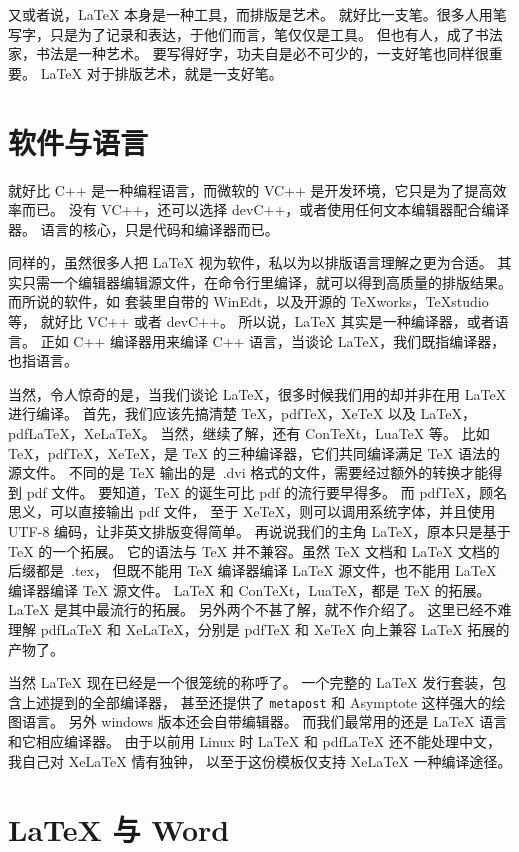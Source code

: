 又或者说，\LaTeX{} 本身是一种工具，而排版是艺术。
就好比一支笔。很多人用笔写字，只是为了记录和表达，于他们而言，笔仅仅是工具。
但也有人，成了书法家，书法是一种艺术。
要写得好字，功夫自是必不可少的，一支好笔也同样很重要。
\LaTeX{} 对于排版艺术，就是一支好笔。


\section{软件与语言}

就好比 C++ 是一种编程语言，而微软的 VC++ 是开发环境，它只是为了提高效率而已。
没有 VC++，还可以选择 devC++，或者使用任何文本编辑器配合编译器。
语言的核心，只是代码和编译器而已。

同样的，虽然很多人把 \LaTeX{} 视为软件，私以为以排版语言理解之更为合适。
其实只需一个编辑器编辑源文件，在命令行里编译，就可以得到高质量的排版结果。
而所说的软件，如 \CTeX 套装里自带的 WinEdt，以及开源的 TeXworks，TeXstudio 等，
就好比 VC++ 或者 devC++。
所以说，\LaTeX{} 其实是一种编译器，或者语言。
正如 C++ 编译器用来编译 C++ 语言，当谈论 \LaTeX{}，我们既指编译器，也指语言。

当然，令人惊奇的是，当我们谈论 \LaTeX{}，很多时候我们用的却并非在用 \LaTeX{} 进行编译。
首先，我们应该先搞清楚 TeX，pdfTeX，XeTeX 以及 LaTeX，pdfLaTeX，XeLaTeX。
当然，继续了解，还有 ConTeXt，LuaTeX 等。
比如 TeX，pdfTeX，XeTeX，是 TeX 的三种编译器，它们共同编译满足 TeX 语法的源文件。
不同的是 TeX 输出的是~.dvi 格式的文件，需要经过额外的转换才能得到 pdf 文件。
要知道，TeX 的诞生可比 pdf 的流行要早得多。
而 pdfTeX，顾名思义，可以直接输出 pdf 文件，
至于 XeTeX，则可以调用系统字体，并且使用 UTF-8 编码，让非英文排版变得简单。
再说说我们的主角 LaTeX，原本只是基于 TeX 的一个拓展。
它的语法与 TeX 并不兼容。虽然 TeX 文档和 LaTeX 文档的后缀都是~.tex，
但既不能用 TeX 编译器编译 LaTeX 源文件，也不能用 LaTeX 编译器编译 TeX 源文件。
LaTeX 和 ConTeXt，LuaTeX，都是 TeX 的拓展。
LaTeX 是其中最流行的拓展。
另外两个不甚了解，就不作介绍了。
这里已经不难理解 pdfLaTeX 和 XeLaTeX，分别是 pdfTeX 和 XeTeX 向上兼容 LaTeX 拓展的产物了。

当然 \LaTeX{} 现在已经是一个很笼统的称呼了。
一个完整的 \LaTeX{} 发行套装，包含上述提到的全部编译器，
甚至还提供了 \texttt{metapost} 和 Asymptote 这样强大的绘图语言。
另外 windows 版本还会自带编辑器。
而我们最常用的还是 \LaTeX{} 语言和它相应编译器。
由于以前用 Linux 时 LaTeX 和 pdfLaTeX 还不能处理中文，
我自己对 XeLaTeX 情有独钟，
以至于这份模板仅支持 XeLaTeX 一种编译途径。


\section{\LaTeX{} 与 Word}

